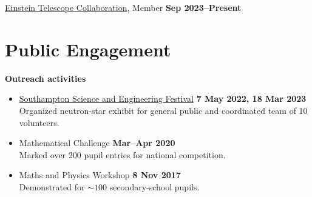 \begin{resume}
\href{https://einsteintelescope.eu/}{Einstein Telescope Collaboration}, Member
\hfill \textbf{Sep 2023--Present}





\section{Public Engagement}

\textbf{Outreach activities}
%
\vspace*{0.05in}
\begin{itemize}
    \item[] \href{https://www.sotsef.co.uk/}
    {Southampton Science and Engineering Festival}
    \hfill \textbf{7 May 2022, 18 Mar 2023} \\
    \hspace*{1em} Organized neutron-star exhibit for general public and
    coordinated team of 10 volunteers.
    \item[] Mathematical Challenge \hfill \textbf{Mar--Apr 2020} \\
    \hspace*{1em} Marked over 200 pupil entries for national competition.
    \item[] Maths and Physics Workshop \hfill \textbf{8 Nov 2017} \\
    \hspace*{1em} Demonstrated for $\sim 100$ secondary-school pupils.
\end{itemize}


\end{resume}
